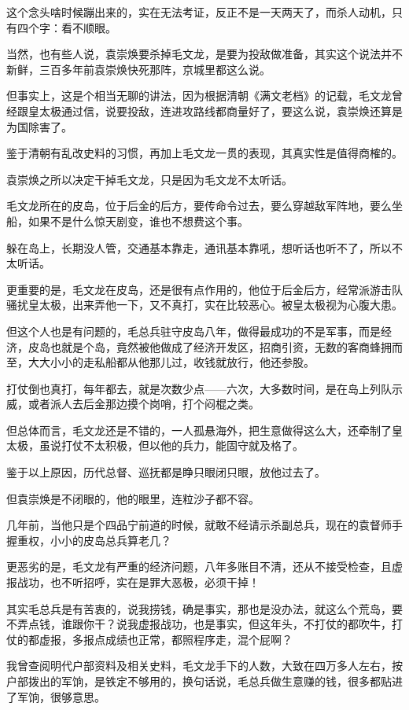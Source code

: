 \begin{multicols}{\theparacolNo}
这个念头啥时候蹦出来的，实在无法考证，反正不是一天两天了，而杀人动机，只有四个字：看不顺眼。

当然，也有些人说，袁崇焕要杀掉毛文龙，是要为投敌做准备，其实这个说法并不新鲜，三百多年前袁崇焕快死那阵，京城里都这么说。

但事实上，这是个相当无聊的讲法，因为根据清朝《满文老档》的记载，毛文龙曾经跟皇太极通过信，说要投敌，连进攻路线都商量好了，要这么说，袁崇焕还算是为国除害了。

鉴于清朝有乱改史料的习惯，再加上毛文龙一贯的表现，其真实性是值得商榷的。

袁崇焕之所以决定干掉毛文龙，只是因为毛文龙不太听话。

毛文龙所在的皮岛，位于后金的后方，要传命令过去，要么穿越敌军阵地，要么坐船，如果不是什么惊天剧变，谁也不想费这个事。

躲在岛上，长期没人管，交通基本靠走，通讯基本靠吼，想听话也听不了，所以不太听话。

更重要的是，毛文龙在皮岛，还是很有点作用的，他位于后金后方，经常派游击队骚扰皇太极，出来弄他一下，又不真打，实在比较恶心。被皇太极视为心腹大患。

但这个人也是有问题的，毛总兵驻守皮岛八年，做得最成功的不是军事，而是经济，皮岛也就是个岛，竟然被他做成了经济开发区，招商引资，无数的客商蜂拥而至，大大小小的走私船都从他那儿过，收钱就放行，他还参股。

打仗倒也真打，每年都去，就是次数少点——六次，大多数时间，是在岛上列队示威，或者派人去后金那边摸个岗哨，打个闷棍之类。

但总体而言，毛文龙还是不错的，一人孤悬海外，把生意做得这么大，还牵制了皇太极，虽说打仗不太积极，但以他的兵力，能固守就及格了。

鉴于以上原因，历代总督、巡抚都是睁只眼闭只眼，放他过去了。

但袁崇焕是不闭眼的，他的眼里，连粒沙子都不容。

几年前，当他只是个四品宁前道的时候，就敢不经请示杀副总兵，现在的袁督师手握重权，小小的皮岛总兵算老几？

更恶劣的是，毛文龙有严重的经济问题，八年多账目不清，还从不接受检查，且虚报战功，也不听招呼，实在是罪大恶极，必须干掉！

其实毛总兵是有苦衷的，说我捞钱，确是事实，那也是没办法，就这么个荒岛，要不弄点钱，谁跟你干？说我虚报战功，也是事实，但这年头，不打仗的都吹牛，打仗的都虚报，多报点成绩也正常，都照程序走，混个屁啊？

我曾查阅明代户部资料及相关史料，毛文龙手下的人数，大致在四万多人左右，按户部拨出的军饷，是铁定不够用的，换句话说，毛总兵做生意赚的钱，很多都贴进了军饷，很够意思。


\end{multicols}
